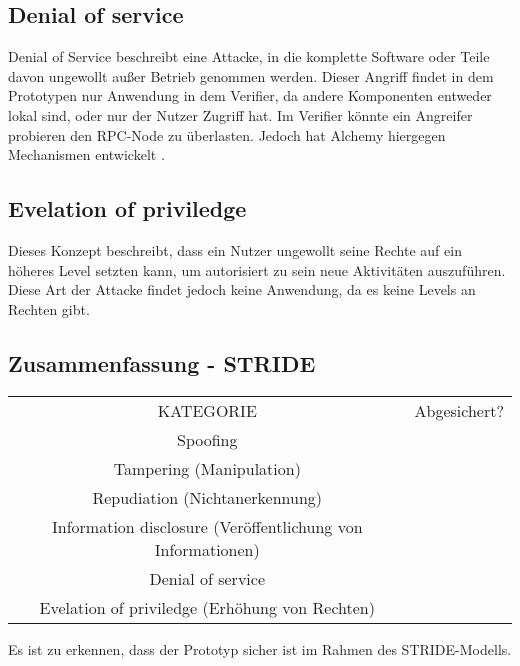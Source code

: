 \subsection{Denial of service}
Denial of Service beschreibt eine Attacke, in die komplette Software oder Teile davon ungewollt außer Betrieb genommen werden. Dieser Angriff findet in dem Prototypen nur Anwendung in dem Verifier, da andere Komponenten entweder lokal sind, oder nur der Nutzer Zugriff hat. Im Verifier könnte ein Angreifer probieren den RPC-Node zu überlasten. Jedoch hat Alchemy hiergegen Mechanismen entwickelt \cite{ID61}.

\subsection{Evelation of priviledge}
Dieses Konzept beschreibt, dass ein Nutzer ungewollt seine Rechte auf ein höheres Level setzten kann, um autorisiert zu sein neue Aktivitäten auszuführen. Diese Art der Attacke findet jedoch keine Anwendung, da es keine Levels an Rechten gibt.

\subsection{Zusammenfassung - STRIDE}
\begin{center}
	\begin{tabular}{ c c }
		KATEGORIE & Abgesichert? \\
		Spoofing & \checkmark \\
		Tampering (Manipulation) & \checkmark \\
		Repudiation (Nichtanerkennung) & \checkmark\\
		Information disclosure (Veröffentlichung von Informationen) &\checkmark\\
		Denial of service & \checkmark\\
		Evelation of priviledge (Erhöhung von Rechten) & \checkmark \\
	\end{tabular}
\end{center}
Es ist zu erkennen, dass der Prototyp sicher ist im Rahmen des STRIDE-Modells.

